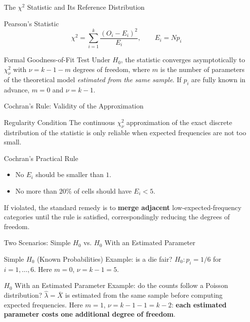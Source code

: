 \documentclass[10pt, aspectratio=169]{beamer}
\begin{document}
\begin{frame}{The $\chi^2$ Statistic and Its Reference Distribution}
  \footnotesize
  \begin{block}{Pearson's Statistic}
    $$\chi^2 = \sum_{i=1}^k \frac{(O_i-E_i)^2}{E_i}, \qquad E_i = Np_i$$
  \end{block}
  \pause

  \vspace{0.1cm}
  \begin{alertblock}{Formal Goodness-of-Fit Test}
    Under $H_0$, the statistic converges asymptotically to $\chi^2_\nu$ with $\nu=k-1-m$ degrees of freedom, where $m$ is the number of parameters of the theoretical model \emph{estimated from the same sample}. If $p_i$ are fully known in advance, $m=0$ and $\nu=k-1$.
  \end{alertblock}
\end{frame}

\begin{frame}{Cochran's Rule: Validity of the Approximation}
  \footnotesize
  \begin{block}{Regularity Condition}
    The continuous $\chi^2_\nu$ approximation of the exact discrete distribution of the statistic is only reliable when expected frequencies are not too small.
  \end{block}
  \pause

  \vspace{0.1cm}
  \begin{alertblock}{Cochran's Practical Rule}
    \begin{itemize}\itemsep=0.05cm
      \item No $E_i$ should be smaller than $1$.
      \item No more than $20\%$ of cells should have $E_i<5$.
    \end{itemize}
    If violated, the standard remedy is to \textbf{merge adjacent} low-expected-frequency categories until the rule is satisfied, correspondingly reducing the degrees of freedom.
  \end{alertblock}
\end{frame}

\begin{frame}{Two Scenarios: Simple $H_0$ vs. $H_0$ With an Estimated Parameter}
  \footnotesize
  \begin{block}{Simple $H_0$ (Known Probabilities)}
    Example: is a die fair? $H_0: p_i=1/6$ for $i=1,\ldots,6$. Here $m=0$, $\nu=k-1=5$.
  \end{block}
  \pause

  \vspace{0.1cm}
  \begin{alertblock}{$H_0$ With an Estimated Parameter}
    Example: do the counts follow a Poisson distribution? $\hat\lambda=\bar X$ is estimated from the same sample before computing expected frequencies. Here $m=1$, $\nu=k-1-1=k-2$: \textbf{each estimated parameter costs one additional degree of freedom}.
  \end{alertblock}
\end{frame}
\end{document}
